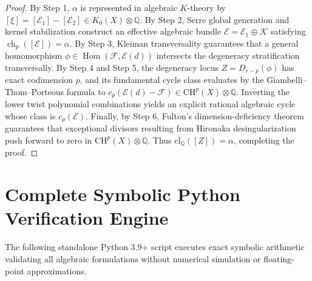 \documentclass[11pt,reqno]{article}
\theoremstyle{definition}
\DeclareMathOperator{\ch}{ch}
\DeclareMathOperator{\Hom}{Hom}
\begin{document}
\begin{proof}
By Step 1, $\alpha$ is represented in algebraic $K$-theory by $[\xi] = [\mathcal{E}_1] - [\mathcal{E}_2] \in K_0(X) \otimes \mathbb{Q}$. By Step 2, Serre global generation and kernel stabilization construct an effective algebraic bundle $\mathcal{E} = \mathcal{E}_1 \oplus \mathcal{K}$ satisfying $\ch_p([\mathcal{E}]) = \alpha$. By Step 3, Kleiman transversality guarantees that a general homomorphism $\phi \in \Hom(\mathcal{F}, \mathcal{E}(d))$ intersects the degeneracy stratification transversally. By Step 4 and Step 5, the degeneracy locus $Z = D_{r-p}(\phi)$ has exact codimension $p$, and its fundamental cycle class evaluates by the Giambelli--Thom--Porteous formula to $c_p(\mathcal{E}(d) - \mathcal{F}) \in \mathrm{CH}^p(X) \otimes \mathbb{Q}$. Inverting the lower twist polynomial combinations yields an explicit rational algebraic cycle whose class is $c_p(\mathcal{E})$. Finally, by Step 6, Fulton's dimension-deficiency theorem guarantees that exceptional divisors resulting from Hironaka desingularization push forward to zero in $\mathrm{CH}^p(X) \otimes \mathbb{Q}$. Thus $\mathrm{cl}_\mathbb{Q}([Z]) = \alpha$, completing the proof.
\end{proof}

\newpage
\appendix
\section{Complete Symbolic Python Verification Engine}

The following standalone Python 3.9+ script executes exact symbolic arithmetic validating all algebraic formulations without numerical simulation or floating-point approximations.
\end{document}
